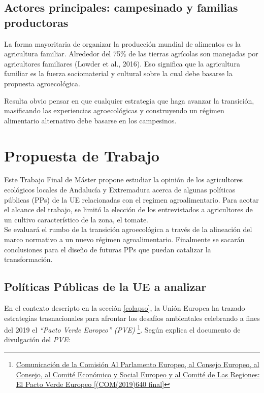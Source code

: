 \documentclass[a4paper, nobind]{templates/ociamthesis}
\begin{document}
\hypertarget{agricultura-familiar}{%
\subsection{Actores principales: campesinado y familias productoras}\label{agricultura-familiar}}

La forma mayoritaria de organizar la producción mundial de alimentos es
la agricultura familiar. Alrededor del 75\% de las tierras agrícolas son
manejadas por agricultores familiares (Lowder et al., 2016). Eso significa que
la agricultura familiar es la fuerza sociomaterial y cultural sobre la
cual debe basarse la propuesta agroecológica.

Resulta obvio pensar en que cualquier estrategia que haga avanzar la
transición, masificando las experiencias agroecológicas y construyendo
un régimen alimentario alternativo debe basarse en los campesinos.

\hypertarget{prouesta_trabajo}{%
\section{Propuesta de Trabajo}\label{prouesta_trabajo}}

Este Trabajo Final de Máster propone estudiar la opinión de los
agricultores ecológicos locales de Andalucía y Extremadura acerca de
algunas políticas públicas (PPs) de la UE relacionadas con el regimen
agroalimentario. Para acotar el alcance del trabajo, se limitó la
elección de los entrevistados a agricultores de un cultivo
característico de la zona, el tomate.\\
Se evaluará el rumbo de la transición agroecológica a través de la
alineación del marco normativo a un nuevo régimen agroalimentario.
Finalmente se sacarán conclusiones para el diseño de futuras PPs que
puedan catalizar la transformación.

\hypertarget{PPs}{%
\subsection{Políticas Públicas de la UE a analizar}\label{PPs}}

En el contexto descripto en la sección \ref{colapso}, la Unión Europea
ha trazado estrategias trasnacionales para afrontar los desafíos
ambientales celebrando a fines del 2019 el \emph{``Pacto Verde Europeo'' (PVE)}
\footnote{\href{https://eur-lex.europa.eu/legal-content/ES/TXT/?uri=COM\%3A2019\%3A640\%3AFIN}{Comunicación de la Comisión Al Parlamento
  Europeo, al Consejo Europeo, al Consejo, al Comité Económico y
  Social Europeo y al Comité de Las Regiones: El Pacto Verde Europeo
  {[}(COM(2019)640
  final{]}}}. Según explica el documento de divulgación del
\emph{PVE}:
\end{document}
